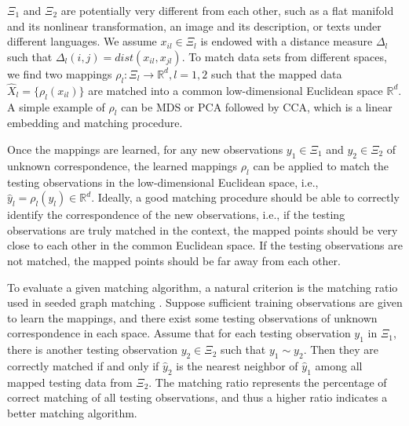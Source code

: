 \documentclass[times,twocolumn,final]{elsarticle}
\begin{document}
$\Xi_{1}$ and $\Xi_{2}$ are potentially very different from each other, such as a flat manifold and its nonlinear transformation, an image and its description, or texts under different languages. We assume $x_{il} \in \Xi_{l}$ is endowed with a distance measure $\Delta_{l}$ such that $\Delta_{l}(i,j)=dist(x_{il},x_{jl})$. To match data sets from different spaces, we find two mappings $\rho_{l}: \Xi_{l} \rightarrow \mathbb{R}^{d}, l=1,2$ such that the mapped data $\hat{X}_{l}=\{ \rho_{l}(x_{il}) \}$ are matched into a common low-dimensional Euclidean space $\mathbb{R}^{d}$. A simple example of $\rho_{l}$ can be MDS or PCA followed by CCA, which is a linear embedding and matching procedure.

Once the mappings are learned, for any new observations $y_{1} \in \Xi_{1}$ and $y_{2} \in \Xi_{2}$ of unknown correspondence, the learned mappings $\rho_{l}$ can be applied to match the testing observations in the low-dimensional Euclidean space, i.e., $\hat{y}_{l} = \rho_{l}(y_{l}) \in \mathbb{R}^{d}$. Ideally, a good matching procedure should be able to correctly identify the correspondence of the new observations, i.e., if the testing observations are truly matched in the context, the mapped points should be very close to each other in the common Euclidean space. If the testing observations are not matched, the mapped points should be far away from each other.

To evaluate a given matching algorithm, a natural criterion is the matching ratio used in seeded graph matching \citep{LyzinskiFishkindPriebe2014}. Suppose sufficient training observations are given to learn the mappings, and there exist some testing observations of unknown correspondence in each space. Assume that for each testing observation $y_{1}$ in $\Xi_{1}$, there is another testing observation $y_{2} \in \Xi_{2}$ such that $y_{1} \sim y_{2}$. Then they are correctly matched if and only if $\hat{y}_{2}$ is the nearest neighbor of $\hat{y}_{1}$ among all mapped testing data from $\Xi_{2}$. The matching ratio represents the percentage of correct matching of all testing observations, and thus a higher ratio indicates a better matching algorithm. 
\end{document}
